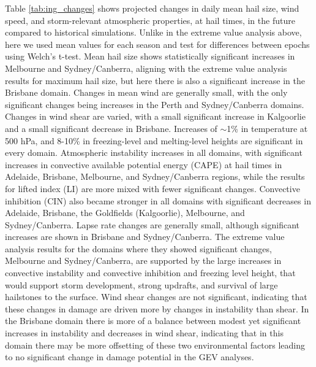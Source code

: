 \documentclass[]{agujournal2019}\usepackage[]{graphicx}\usepackage[]{xcolor}
\begin{document}
Table \ref{tab:ing_changes} shows projected changes in daily mean hail size, wind speed, and storm-relevant atmospheric properties, at hail times, in the future compared to historical simulations. Unlike in the extreme  value analysis above, here we used mean values for each season and test for differences between epochs using Welch's t-test. Mean hail size shows statistically significant increases in Melbourne and Sydney/Canberra, aligning with the extreme value analysis results for maximum hail size, but here there is also a significant increase in the Brisbane domain. Changes in mean wind are generally small, with the only significant changes being increases in the Perth and Sydney/Canberra domains. Changes in wind shear are varied, with a small significant increase in Kalgoorlie and a small significant decrease in Brisbane. Increases of $\sim$1\% in temperature at 500 hPa, and 8-10\% in freezing-level and melting-level heights are significant in every domain. Atmospheric instability increases in all domains, with significant increases in convective available potential energy (CAPE) at hail times in Adelaide, Brisbane, Melbourne, and Sydney/Canberra regions, while the results for lifted index (LI) are more mixed with fewer significant changes. Convective inhibition (CIN) also became stronger in all domains with significant decreases in Adelaide, Brisbane, the Goldfields (Kalgoorlie), Melbourne, and Sydney/Canberra. Lapse rate changes are generally small, although significant increases are shown in Brisbane and Sydney/Canberra. The extreme value analysis results for the domains where they showed significant changes, Melbourne and Sydney/Canberra, are supported by the large increases in convective instability and convective inhibition and freezing level height, that would support storm development, strong updrafts, and survival of large hailstones to the surface. Wind shear changes are not significant, indicating that these changes in damage are driven more by changes in instability than shear. In the Brisbane domain there is more of a balance between modest yet significant increases in 
instability and decreases in wind shear, indicating that in this domain there may be more offsetting of these two environmental factors leading to no significant change in damage potential in the GEV analyses.
\end{document}
